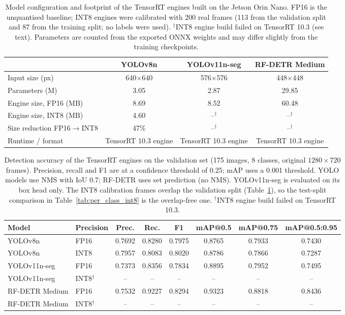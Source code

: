 \begin{table}[t]
\centering
\caption{Model configuration and footprint of the TensorRT engines built on the Jetson Orin Nano. FP16 is the unquantised baseline; INT8 engines were calibrated with 200 real frames (113 from the validation split and 87 from the training split; no labels were used). $^{\dagger}$INT8 engine build failed on TensorRT 10.3 (see text). Parameters are counted from the exported ONNX weights and may differ slightly from the training checkpoints.}
\label{tab:edge-config}
\footnotesize\setlength{\tabcolsep}{3pt}
\begin{tabular}{lccc}
\toprule
 & YOLOv8n & YOLOv11n-seg & RF-DETR Medium \\
\midrule
Input size (px) & 640${\times}$640 & 576${\times}$576 & 448${\times}$448 \\
Parameters (M) & 3.05 & 2.87 & 29.85 \\
Engine size, FP16 (MB) & 8.69 & 8.52 & 60.48 \\
Engine size, INT8 (MB) & 4.60 & --$^{\dagger}$ & --$^{\dagger}$ \\
Size reduction FP16$\rightarrow$INT8 & 47\% & --$^{\dagger}$ & --$^{\dagger}$ \\
Runtime / format & TensorRT 10.3 engine & TensorRT 10.3 engine & TensorRT 10.3 engine \\
\bottomrule
\end{tabular}
\end{table}

\begin{table}[t]
\centering
\caption{Detection accuracy of the TensorRT engines on the validation set (175 images, 8 classes, original $1280{\times}720$ frames). Precision, recall and F1 are at a confidence threshold of 0.25; mAP uses a 0.001 threshold. YOLO models use NMS with IoU 0.7; RF-DETR uses set prediction (no NMS). YOLOv11n-seg is evaluated on its box head only. The INT8 calibration frames overlap the validation split (Table~\ref{tab:edge-config}), so the test-split comparison in Table~\ref{tab:per_class_int8} is the overlap-free one. $^{\dagger}$INT8 engine build failed on TensorRT 10.3.}
\label{tab:edge-acc}
\footnotesize\setlength{\tabcolsep}{3pt}
\begin{tabular}{@{}llcccccc@{}}
\toprule
Model & Precision & Prec. & Rec. & F1 & mAP@0.5 & mAP@0.75 & mAP@0.5:0.95 \\
\midrule
YOLOv8n & FP16 & 0.7692 & 0.8280 & 0.7975 & 0.8765 & 0.7933 & 0.7430 \\
YOLOv8n & INT8 & 0.7957 & 0.8083 & 0.8020 & 0.8786 & 0.7866 & 0.7287 \\
YOLOv11n-seg & FP16 & 0.7373 & 0.8356 & 0.7834 & 0.8895 & 0.7952 & 0.7495 \\
YOLOv11n-seg & INT8$^{\dagger}$ & -- & -- & -- & -- & -- & -- \\
RF-DETR Medium & FP16 & 0.7532 & 0.9227 & 0.8294 & 0.9323 & 0.8818 & 0.8436 \\
RF-DETR Medium & INT8$^{\dagger}$ & -- & -- & -- & -- & -- & -- \\
\bottomrule
\end{tabular}
\end{table}


